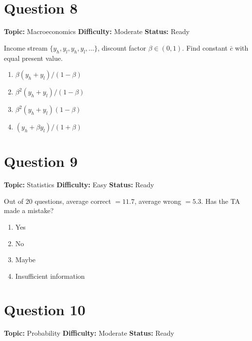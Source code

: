 \documentclass[11pt]{article}
\begin{document}
\newpage

\section*{Question 8}


\noindent\textbf{Topic:} Macroeconomics \quad \textbf{Difficulty:} Moderate \quad \textbf{Status:} Ready



Income stream $\{y_h, y_l, y_h, y_l, \ldots\}$, discount factor $\beta\in(0,1)$. Find constant $\bar c$ with equal present value.
\begin{enumerate}[label=(\Alph*)]
\item $\beta(y_h + y_l)/(1-\beta)$
\item $\beta^2(y_h+y_l)/(1-\beta)$
\item $\beta^2(y_h+y_l)(1-\beta)$
\item $(y_h + \beta y_l)/(1+\beta)$
\end{enumerate}

\newpage

\section*{Question 9}


\noindent\textbf{Topic:} Statistics \quad \textbf{Difficulty:} Easy \quad \textbf{Status:} Ready



Out of 20 questions, average correct $= 11.7$, average wrong $= 5.3$. Has the TA made a mistake?
\begin{enumerate}[label=(\Alph*)]
\item Yes \item No \item Maybe \item Insufficient information
\end{enumerate}

\newpage

\section*{Question 10}


\noindent\textbf{Topic:} Probability \quad \textbf{Difficulty:} Moderate \quad \textbf{Status:} Ready
\end{document}
